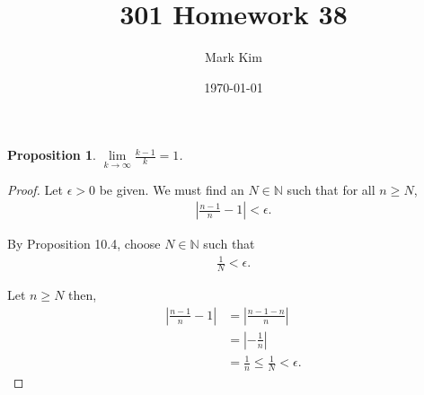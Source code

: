 \documentclass[12pt]{amsart}
\title{301 Homework 38}
\author{Mark Kim}
\date{\today}
\newcommand{\N}{\mathbb{N}}
\newtheorem*{proposition}{Proposition}
\begin{document}
\maketitle

\begin{proposition}
$\lim\limits_{k \to \infty} \frac{k-1}{k}=1$.
\end{proposition}

\begin{proof}
Let $\epsilon > 0$ be given.  We must find an $N\in\N$ such that for all $n\geq N$,
\begin{align*}
\left\lvert\frac{n-1}{n}-1\right\rvert < \epsilon.
\end{align*}

By Proposition 10.4, choose $N\in\N$ such that
\begin{align*}
\frac{1}{N} < \epsilon.
\end{align*}

Let $n\geq N$ then,
\begin{align*}
\left\lvert\frac{n-1}{n}-1\right\rvert &= \left\lvert\frac{n-1-n}{n}\right\rvert\\
&= \left\lvert -\frac{1}{n}\right\rvert\\
&= \frac{1}{n} \leq \frac{1}{N} < \epsilon.
\end{align*}
\end{proof}
\end{document}
